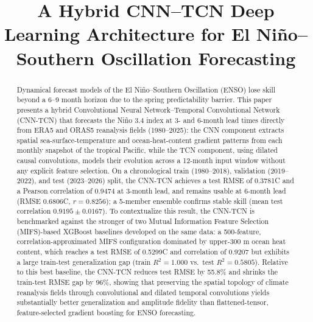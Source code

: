 \documentclass[conference]{IEEEtran}
\begin{document}
\title{A Hybrid CNN--TCN Deep Learning Architecture for El Ni\~no--Southern Oscillation Forecasting}

\author{
}

\maketitle

\begin{abstract}
Dynamical forecast models of the El Ni\~no--Southern Oscillation (ENSO) lose skill beyond a 6--9 month horizon due to the spring predictability barrier. This paper presents a hybrid Convolutional Neural Network--Temporal Convolutional Network (CNN-TCN) that forecasts the Ni\~no 3.4 index at 3- and 6-month lead times directly from ERA5 and ORAS5 reanalysis fields (1980--2025): the CNN component extracts spatial sea-surface-temperature and ocean-heat-content gradient patterns from each monthly snapshot of the tropical Pacific, while the TCN component, using dilated causal convolutions, models their evolution across a 12-month input window without any explicit feature selection. On a chronological train (1980--2018), validation (2019--2022), and test (2023--2026) split, the CNN-TCN achieves a test RMSE of 0.3781\textdegree C and a Pearson correlation of 0.9474 at 3-month lead, and remains usable at 6-month lead (RMSE 0.6806\textdegree C, $r=0.8256$); a 5-member ensemble confirms stable skill (mean test correlation $0.9195\pm0.0167$). To contextualize this result, the CNN-TCN is benchmarked against the stronger of two Mutual Information Feature Selection (MIFS)-based XGBoost baselines developed on the same data: a 500-feature, correlation-approximated MIFS configuration dominated by upper-300 m ocean heat content, which reaches a test RMSE of 0.5299\textdegree C and correlation of 0.9207 but exhibits a large train-test generalization gap (train $R^2=1.000$ vs.\ test $R^2=0.5805$). Relative to this best baseline, the CNN-TCN reduces test RMSE by 55.8\% and shrinks the train-test RMSE gap by 96\%, showing that preserving the spatial topology of climate reanalysis fields through convolutional and dilated temporal convolutions yields substantially better generalization and amplitude fidelity than flattened-tensor, feature-selected gradient boosting for ENSO forecasting.
\end{abstract}
\end{document}
